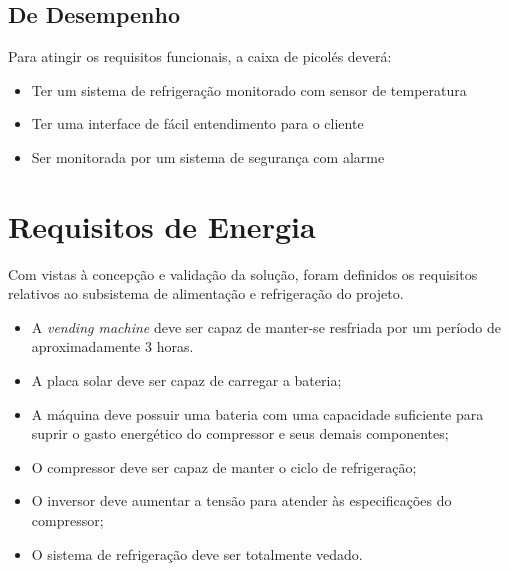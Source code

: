 \subsection{De Desempenho}
Para atingir os requisitos funcionais, a caixa de picolés deverá:
\begin{itemize}
\item Ter um sistema de refrigeração monitorado com sensor de temperatura
\item Ter uma interface de fácil entendimento para o cliente
\item Ser monitorada por um sistema de segurança com alarme
\end{itemize}

\section{Requisitos de Energia}

Com vistas à concepção e validação da solução, foram definidos os requisitos relativos ao subsistema de alimentação e refrigeração do projeto.

\begin{itemize}
\item A \textit{vending machine} deve ser capaz de manter-se resfriada por um período de aproximadamente 3 horas.
\item A placa solar deve ser capaz de carregar a bateria;
\item A máquina deve possuir uma bateria com uma capacidade suficiente para suprir o gasto energético do compressor e seus demais componentes;
\item O compressor deve ser capaz de manter o ciclo de refrigeração;
\item O inversor deve aumentar a tensão para atender às especificações do compressor;
\item O sistema de refrigeração deve ser totalmente vedado.
\end{itemize}